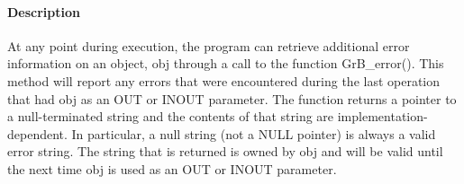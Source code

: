 \paragraph{Description}

At any point during execution, the program can retrieve additional error 
information on an object, {\sf obj} through a call to the function 
{\sf GrB\_error()}.  This method will report any errors that were encountered 
during the last operation that had {\sf obj} as an {\sf OUT} or {\sf INOUT} 
parameter.   The function returns a pointer to a null-terminated string and the 
contents of that string are implementation-dependent.  In particular, a null 
string (not a {\sf NULL} pointer) is always a valid error string.  The string 
that is returned is owned by {\sf obj} and will be valid until the next time 
{\sf obj} is used as an {\sf OUT} or {\sf INOUT} parameter.
